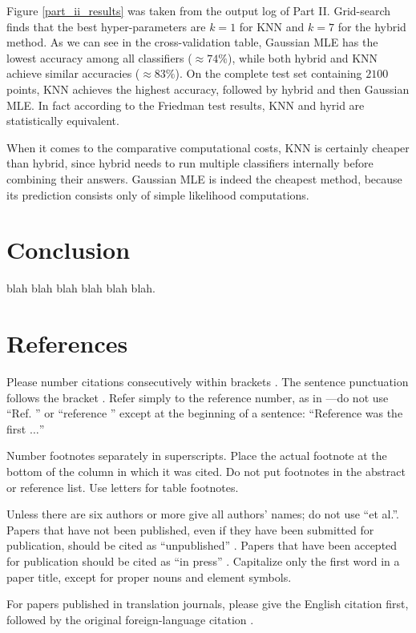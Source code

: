 \documentclass[conference]{IEEEtran}
\begin{document}
Figure \ref{part_ii_results} was taken from the output log of Part II.
Grid-search finds that the best hyper-parameters are $k = 1$ for KNN and $k = 7$ for the hybrid method.
As we can see in the cross-validation table, Gaussian MLE has the lowest accuracy among all classifiers ($\approx74\%$), while both hybrid and KNN achieve similar accuracies ($\approx 83\%$).
On the complete test set containing $2100$ points, KNN achieves the highest accuracy, followed by hybrid and then Gaussian MLE.
In fact according to the Friedman test results, KNN and hyrid are statistically equivalent.

When it comes to the comparative computational costs, KNN is certainly cheaper than hybrid, since hybrid needs to run multiple classifiers internally before combining their answers.
Gaussian MLE is indeed the cheapest method, because its prediction consists only of simple likelihood computations.

\section{Conclusion}

blah blah blah blah blah blah.

\section*{References}

Please number citations consecutively within brackets \cite{b1}. The 
sentence punctuation follows the bracket \cite{b2}. Refer simply to the reference 
number, as in \cite{b3}---do not use ``Ref. \cite{b3}'' or ``reference \cite{b3}'' except at 
the beginning of a sentence: ``Reference \cite{b3} was the first $\ldots$''

Number footnotes separately in superscripts. Place the actual footnote at 
the bottom of the column in which it was cited. Do not put footnotes in the 
abstract or reference list. Use letters for table footnotes.

Unless there are six authors or more give all authors' names; do not use 
``et al.''. Papers that have not been published, even if they have been 
submitted for publication, should be cited as ``unpublished'' \cite{b4}. Papers 
that have been accepted for publication should be cited as ``in press'' \cite{b5}. 
Capitalize only the first word in a paper title, except for proper nouns and 
element symbols.

For papers published in translation journals, please give the English 
citation first, followed by the original foreign-language citation \cite{b6}.
\end{document}
